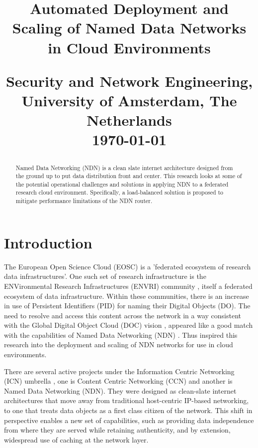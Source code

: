 \documentclass[conference]{IEEEtran}
\begin{document}
\title{Automated Deployment and Scaling of Named Data Networks in Cloud Environments

{\large
Security and Network Engineering, University of Amsterdam, The Netherlands
}
\\
\vspace*{5pt}
\normalsize
\today
}
\author{
}

\maketitle
\begin{abstract}
Named Data Networking (NDN) is a clean slate internet architecture
designed from the ground up to put data distribution front and center.
This research looks at some of the potential operational challenges
and solutions in applying NDN to a federated research cloud environment.
Specifically, a load-balanced solution is proposed to mitigate
performance limitations of the NDN router.
\end{abstract}



\section*{Introduction}
The European Open Science Cloud (EOSC) \cite{eosc} is a
'federated ecosystem of research data infrastructures'.
One such set of research infrastructure is
the ENVironmental Research Infrastructures (ENVRI) community \cite{envri},
itself a federated ecosystem of data infrastructure.
Within these communities, there is an increase in use of
Persistent Identifiers (PID) for naming their Digital Objects (DO).
The need to resolve and access this content across the network
in a way consistent with the Global Digital Object Cloud (DOC) vision \cite{objcloud},
appeared like a good match with the capabilities of
Named Data Networking (NDN) \cite{ndn}.
Thus inspired this research into the deployment and scaling
of NDN networks for use in cloud environments.

There are several active projects under the
Information Centric Networking (ICN) umbrella \cite{icn},
one is Content Centric Networking (CCN)
and another is Named Data Networking (NDN).
They were designed as clean-slate internet architectures
that move away from traditional host-centric IP-based networking,
to one that treats data objects as a first class citizen of the network.
This shift in perspective enables a new set of capabilities,
such as providing data independence from where they are served
while retaining authenticity, and by extension,
widespread use of caching at the network layer.
\end{document}
